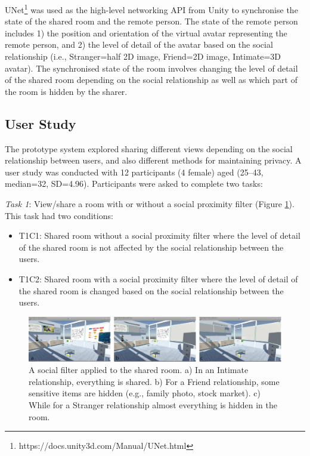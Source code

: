 UNet\footnote{https://docs.unity3d.com/Manual/UNet.html} was used as the high-level networking API from Unity to synchronise the state of the shared room and the remote person. The state of the remote person includes 1) the position and orientation of the virtual avatar representing the remote person, and 2) the level of detail of the avatar based on the social relationship (i.e., Stranger=half 2D image, Friend=2D image, Intimate=3D avatar). The synchronised state of the room involves changing the level of detail of the shared room depending on the social relationship as well as which part of the room is hidden by the sharer. 

\subsection{User Study}

The prototype system explored sharing different views depending on the social relationship between users, and also different methods for maintaining privacy. A user study was conducted with 12 participants (4 female) aged (25–43, median=32, SD=4.96). Participants were asked to complete two tasks: 

\textit{Task 1}: View/share a room with or without a social proximity filter (Figure \ref{fig:frontier18:social-filter}). This task had two conditions: 

\begin{itemize}
    \item T1C1: Shared room without a social proximity filter where the level of detail of the shared room is not affected by the social relationship between the users.
    \item T1C2: Shared room with a social proximity filter where the level of detail of the shared room is changed based on the social relationship between the users. 
\end{itemize}

\begin{figure}[H]
    \begin{center}
    \includegraphics[width=\linewidth]{images/frontier18/images-02.png}
    \caption{A social filter applied to the shared room. a) In an Intimate relationship, everything is shared. b) For a Friend relationship, some sensitive items are hidden (e.g., family photo, stock market). c) While for a Stranger relationship almost everything is hidden in the room.}\label{fig:frontier18:social-filter}
    \end{center}
\end{figure}

